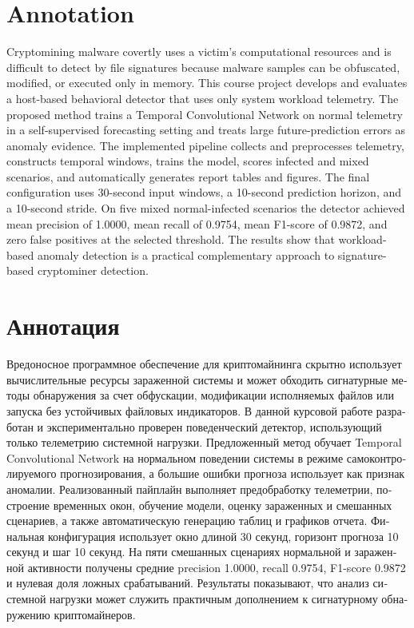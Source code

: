 \documentclass[a4paper,12pt]{extarticle}
\begin{document}

\newpage
\setcounter{page}{2}

{
\hypersetup{linkcolor=black}
\tableofcontents
}

\newpage
\section*{Annotation}

Cryptomining malware covertly uses a victim's computational resources and is difficult to detect by file signatures because malware samples can be obfuscated, modified, or executed only in memory. This course project develops and evaluates a host-based behavioral detector that uses only system workload telemetry. The proposed method trains a Temporal Convolutional Network on normal telemetry in a self-supervised forecasting setting and treats large future-prediction errors as anomaly evidence. The implemented pipeline collects and preprocesses telemetry, constructs temporal windows, trains the model, scores infected and mixed scenarios, and automatically generates report tables and figures. The final configuration uses 30-second input windows, a 10-second prediction horizon, and a 10-second stride. On five mixed normal-infected scenarios the detector achieved mean precision of 1.0000, mean recall of 0.9754, mean F1-score of 0.9872, and zero false positives at the selected threshold. The results show that workload-based anomaly detection is a practical complementary approach to signature-based cryptominer detection.

\section*{\foreignlanguage{russian}{Аннотация}}
\foreignlanguage{russian}{
Вредоносное программное обеспечение для криптомайнинга скрытно использует вычислительные ресурсы зараженной системы и может обходить сигнатурные методы обнаружения за счет обфускации, модификации исполняемых файлов или запуска без устойчивых файловых индикаторов. В данной курсовой работе разработан и экспериментально проверен поведенческий детектор, использующий только телеметрию системной нагрузки. Предложенный метод обучает Temporal Convolutional Network на нормальном поведении системы в режиме самоконтролируемого прогнозирования, а большие ошибки прогноза использует как признак аномалии. Реализованный пайплайн выполняет предобработку телеметрии, построение временных окон, обучение модели, оценку зараженных и смешанных сценариев, а также автоматическую генерацию таблиц и графиков отчета. Финальная конфигурация использует окно длиной 30 секунд, горизонт прогноза 10 секунд и шаг 10 секунд. На пяти смешанных сценариях нормальной и зараженной активности получены средние precision 1.0000, recall 0.9754, F1-score 0.9872 и нулевая доля ложных срабатываний. Результаты показывают, что анализ системной нагрузки может служить практичным дополнением к сигнатурному обнаружению криптомайнеров.
}
\end{document}
